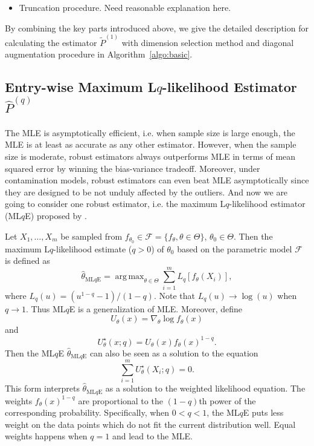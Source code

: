 \documentclass[a4paper]{article}
\DeclareMathOperator*{\argmax}{arg\,max}
\renewcommand{\hat}{\widehat}
\begin{document}
\begin{itemize}
\item Truncation procedure. Need reasonable explanation here.
\end{itemize}

By combining the key parts introduced above, we give the detailed description for calculating the estimator $\widetilde{P}^{(1)}$ with dimension selection method and diagonal augmentation procedure in Algorithm~\ref{algo:basic}.




\subsection{Entry-wise Maximum L$q$-likelihood Estimator $\hat{P}^{(q)}$}

The MLE is asymptotically efficient, i.e. when sample size is large enough, the MLE is at least as accurate as any other estimator. However, when the sample size is moderate, robust estimators always outperforms MLE in terms of mean squared error by winning the bias-variance tradeoff. Moreover, under contamination models, robust estimators can even beat MLE asymptotically since they are designed to be not unduly affected by the outliers. And now we are going to consider one robust estimator, i.e. the maximum L$q$-likelihood estimator (ML$q$E) proposed by \citet{ferrari2010}.

Let $X_1, \dotsc, X_m$ be sampled from $f_{\theta_0} \in \mathcal{F} = \{ f_{\theta}, \theta \in \Theta \}$, $\theta_0 \in \Theta$. Then the maximum L$q$-likelihood estimate ($q > 0$) of $\theta_0$ based on the parametric model $\mathcal{F}$ is defined as
\[
	\hat{\theta}_{\mathrm{ML}q\mathrm{E}} = \argmax_{\theta \in \Theta} \sum_{i=1}^m L_q[f_{\theta}(X_i)],
\]
where $L_q(u) = (u^{1-q} - 1)/(1- q)$.
Note that $L_q(u) \to \log(u)$ when $q \to 1$. Thus ML$q$E is a generalization of MLE.
Moreover, define
\[
	U_{\theta}(x) = \nabla_{\theta} \log f_{\theta}(x)
\]
and
\[
	U^{\star}_{\theta}(x; q) = U_{\theta}(x) f_{\theta}(x)^{1-q}.
\]
Then the ML$q$E $\hat{\theta}_{\mathrm{ML}q\mathrm{E}}$ can also be seen as a solution to the equation
\[
	\sum_{i=1}^m U^{\star}_{\theta}(X_i; q) = 0.
\]
This form interprets $\hat{\theta}_{\mathrm{ML}q\mathrm{E}}$ as a solution to the weighted likelihood equation. The weights $f_{\theta}(x)^{1-q}$ are proportional to the $(1-q)$th power of the corresponding probability. Specifically, when $0 < q < 1$, the ML$q$E puts less weight on the data points which do not fit the current distribution well. Equal weights happens when $q=1$ and lead to the MLE.
\end{document}
